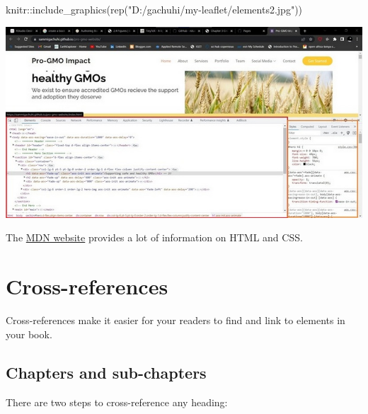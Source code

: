 \documentclass[
]{book}
\newenvironment{Shaded}{\begin{snugshade}}{\end{snugshade}}
\newcommand{\FunctionTok}[1]{\textcolor[rgb]{0.00,0.00,0.00}{#1}}
\newcommand{\NormalTok}[1]{#1}
\newcommand{\SpecialCharTok}[1]{\textcolor[rgb]{0.00,0.00,0.00}{#1}}
\newcommand{\StringTok}[1]{\textcolor[rgb]{0.31,0.60,0.02}{#1}}
\theoremstyle{definition}
\theoremstyle{definition}
\theoremstyle{definition}
\theoremstyle{definition}
\theoremstyle{remark}
\begin{document}
\begin{Shaded}
\begin{Highlighting}[]
\NormalTok{knitr}\SpecialCharTok{::}\FunctionTok{include\_graphics}\NormalTok{(}\FunctionTok{rep}\NormalTok{(}\StringTok{"D:/gachuhi/my{-}leaflet/elements2.jpg"}\NormalTok{))}
\end{Highlighting}
\end{Shaded}

\includegraphics[width=26.67in]{../elements2}

The \href{https://developer.mozilla.org/en-US/docs/Learn/CSS/First_steps/How_CSS_is_structured}{MDN website} provides a lot of information on HTML and CSS.

\hypertarget{cross}{%
\chapter{Cross-references}\label{cross}}

Cross-references make it easier for your readers to find and link to elements in your book.

\hypertarget{chapters-and-sub-chapters}{%
\section{Chapters and sub-chapters}\label{chapters-and-sub-chapters}}

There are two steps to cross-reference any heading:
\end{document}
